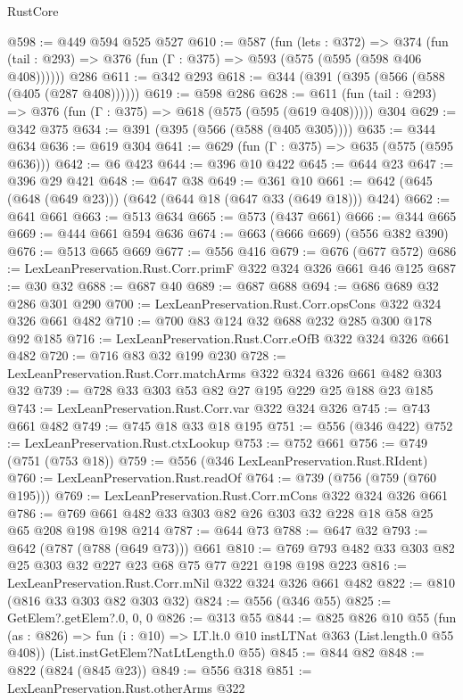 \begin{lexlean}{RustCore}
\begin{coremodule}
@598 := @449 @594 @525 @527
@610 := @587
    (fun (lets : @372) =>
    @374 (fun (tail : @293) => @376 (fun (Γ : @375) => @593 (@575 (@595 (@598 @406 @408))))))
    @286
@611 := @342 @293
@618 := @344 (@391 (@395 (@566 (@588 (@405 (@287 @408))))))
@619 := @598 @286
@628 := @611 (fun (tail : @293) => @376 (fun (Γ : @375) => @618 (@575 (@595 (@619 @408))))) @304
@629 := @342 @375
@634 := @391 (@395 (@566 (@588 (@405 @305))))
@635 := @344 @634
@636 := @619 @304
@641 := @629 (fun (Γ : @375) => @635 (@575 (@595 @636)))
@642 := @6 @423
@644 := @396 @10 @422
@645 := @644 @23
@647 := @396 @29 @421
@648 := @647 @38
@649 := @361 @10
@661 := @642 (@645 (@648 (@649 @23))) (@642 (@644 @18 (@647 @33 (@649 @18))) @424)
@662 := @641 @661
@663 := @513 @634
@665 := @573 (@437 @661)
@666 := @344 @665
@669 := @444 @661 @594 @636
@674 := @663 (@666 @669) (@556 @382 @390)
@676 := @513 @665 @669
@677 := @556 @416
@679 := @676 (@677 @572)
@686 := LexLeanPreservation.Rust.Corr.primF @322 @324 @326 @661 @46 @125
@687 := @30 @32
@688 := @687 @40
@689 := @687 @688
@694 := @686 @689 @32 @286 @301 @290
@700 := LexLeanPreservation.Rust.Corr.opsCons @322 @324 @326 @661 @482
@710 := @700 @83 @124 @32 @688 @232 @285 @300 @178 @92 @185
@716 := LexLeanPreservation.Rust.Corr.eOfB @322 @324 @326 @661 @482
@720 := @716 @83 @32 @199 @230
@728 := LexLeanPreservation.Rust.Corr.matchArms @322 @324 @326 @661 @482 @303 @32
@739 := @728 @33 @303 @53 @82 @27 @195 @229 @25 @188 @23 @185
@743 := LexLeanPreservation.Rust.Corr.var @322 @324 @326
@745 := @743 @661 @482
@749 := @745 @18 @33 @18 @195
@751 := @556 (@346 @422)
@752 := LexLeanPreservation.Rust.ctxLookup
@753 := @752 @661
@756 := @749 (@751 (@753 @18))
@759 := @556 (@346 LexLeanPreservation.Rust.RIdent)
@760 := LexLeanPreservation.Rust.readOf
@764 := @739 (@756 (@759 (@760 @195)))
@769 := LexLeanPreservation.Rust.Corr.mCons @322 @324 @326 @661
@786 := @769 @661 @482 @33 @303 @82 @26 @303 @32 @228 @18 @58 @25 @65 @208 @198 @198 @214
@787 := @644 @73
@788 := @647 @32
@793 := @642 (@787 (@788 (@649 @73))) @661
@810 := @769 @793 @482 @33 @303 @82 @25 @303 @32 @227 @23 @68 @75 @77 @221 @198 @198 @223
@816 := LexLeanPreservation.Rust.Corr.mNil @322 @324 @326 @661 @482
@822 := @810 (@816 @33 @303 @82 @303 @32)
@824 := @556 (@346 @55)
@825 := GetElem?.getElem?.{0, 0, 0}
@826 := @313 @55
@844 := @825
    @826
    @10
    @55
    (fun (as : @826) => fun (i : @10) => LT.lt.{0} @10 instLTNat @363 (List.length.{0} @55 @408))
    (List.instGetElem?NatLtLength.{0} @55)
@845 := @844 @82
@848 := @822 (@824 (@845 @23))
@849 := @556 @318
@851 := LexLeanPreservation.Rust.otherArms @322

\end{coremodule}
\end{lexlean}
